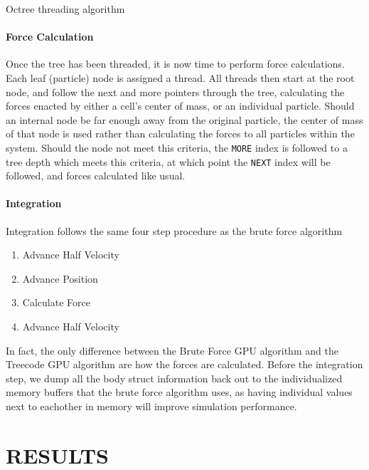 \documentclass{thesis}
\begin{document}
\begin{algorithm}
    \label{alg:OctreeThreading}
    \caption{Octree threading algorithm}
    \begin{algorithmic}
        \EndFor
    \end{algorithmic}
\end{algorithm}
\subsubsection{Force Calculation}
Once the tree has been threaded, it is now time to perform force calculations. Each leaf (particle) node is assigned a thread. All threads then start at the root node, and follow the next and more pointers through the tree, calculating the forces enacted by either a cell's center of mass, or an individual particle. Should an internal node be far enough away from the original particle, the center of mass of that node is used rather than calculating the forces to all particles within the system. Should the node not meet this criteria, the \verb|MORE| index is followed to a tree depth which meets this criteria, at which point the \verb|NEXT| index will be followed, and forces calculated like usual.
\subsubsection{Integration}
Integration follows the same four step procedure as the brute force algorithm
\begin{enumerate}[noitemsep]
    \item Advance Half Velocity
    \item Advance Position
    \item Calculate Force
    \item Advance Half Velocity
\end{enumerate}
In fact, the only difference between the Brute Force GPU algorithm and the Treecode GPU algorithm are how the forces are calculated. Before the integration step, we dump all the body struct information back out to the individualized memory buffers that the brute force algorithm uses, as having individual values next to eachother in memory will improve simulation performance. 
\chapter{RESULTS}
\end{document}
